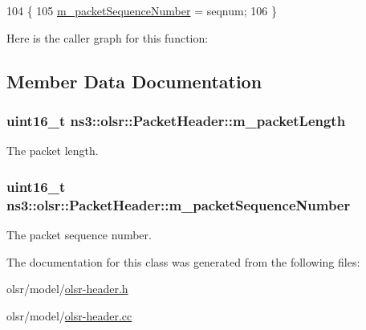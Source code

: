 \begin{DoxyCode}
104   \{
105     \hyperlink{classns3_1_1olsr_1_1PacketHeader_aba3c8769d2caacd2aa6e0ef8e2ad21ef}{m\_packetSequenceNumber} = seqnum;
106   \}
\end{DoxyCode}


Here is the caller graph for this function\+:




\subsection{Member Data Documentation}
\subsubsection[{\texorpdfstring{m\+\_\+packet\+Length}{m_packetLength}}]{\setlength{\rightskip}{0pt plus 5cm}uint16\+\_\+t ns3\+::olsr\+::\+Packet\+Header\+::m\+\_\+packet\+Length\hspace{0.3cm}{\ttfamily [private]}}\hypertarget{classns3_1_1olsr_1_1PacketHeader_aa3a9c586f89ea634d60824846a6e5c94}{}\label{classns3_1_1olsr_1_1PacketHeader_aa3a9c586f89ea634d60824846a6e5c94}


The packet length. 

\subsubsection[{\texorpdfstring{m\+\_\+packet\+Sequence\+Number}{m_packetSequenceNumber}}]{\setlength{\rightskip}{0pt plus 5cm}uint16\+\_\+t ns3\+::olsr\+::\+Packet\+Header\+::m\+\_\+packet\+Sequence\+Number\hspace{0.3cm}{\ttfamily [private]}}\hypertarget{classns3_1_1olsr_1_1PacketHeader_aba3c8769d2caacd2aa6e0ef8e2ad21ef}{}\label{classns3_1_1olsr_1_1PacketHeader_aba3c8769d2caacd2aa6e0ef8e2ad21ef}


The packet sequence number. 



The documentation for this class was generated from the following files\+:\begin{DoxyCompactItemize}
\item 
olsr/model/\hyperlink{olsr-header_8h}{olsr-\/header.\+h}\item 
olsr/model/\hyperlink{olsr-header_8cc}{olsr-\/header.\+cc}\end{DoxyCompactItemize}
